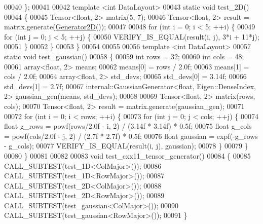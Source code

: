 \begin{DoxyCode}
00040 \};
00041 
00042 \textcolor{keyword}{template} <\textcolor{keywordtype}{int} DataLayout>
00043 \textcolor{keyword}{static} \textcolor{keywordtype}{void} test\_2D()
00044 \{
00045   Tensor<float, 2> matrix(5, 7);
00046   Tensor<float, 2> result = matrix.generate(\hyperlink{struct_generator2_d}{Generator2D}());
00047 
00048   \textcolor{keywordflow}{for} (\textcolor{keywordtype}{int} i = 0; i < 5; ++i) \{
00049     \textcolor{keywordflow}{for} (\textcolor{keywordtype}{int} j = 0; j < 5; ++j) \{
00050       VERIFY\_IS\_EQUAL(result(i, j), 3*i + 11*j);
00051     \}
00052   \}
00053 \}
00054 
00055 
00056 \textcolor{keyword}{template} <\textcolor{keywordtype}{int} DataLayout>
00057 \textcolor{keyword}{static} \textcolor{keywordtype}{void} test\_gaussian()
00058 \{
00059   \textcolor{keywordtype}{int} rows = 32;
00060   \textcolor{keywordtype}{int} cols = 48;
00061   array<float, 2> means;
00062   means[0] = rows / 2.0f;
00063   means[1] = cols / 2.0f;
00064   array<float, 2> std\_devs;
00065   std\_devs[0] = 3.14f;
00066   std\_devs[1] = 2.7f;
00067   internal::GaussianGenerator<float, Eigen::DenseIndex, 2> gaussian\_gen(means, std\_devs);
00068 
00069   Tensor<float, 2> matrix(rows, cols);
00070   Tensor<float, 2> result = matrix.generate(gaussian\_gen);
00071 
00072   \textcolor{keywordflow}{for} (\textcolor{keywordtype}{int} i = 0; i < rows; ++i) \{
00073     \textcolor{keywordflow}{for} (\textcolor{keywordtype}{int} j = 0; j < cols; ++j) \{
00074       \textcolor{keywordtype}{float} g\_rows = powf(rows/2.0f - i, 2) / (3.14f * 3.14f) * 0.5f;
00075       \textcolor{keywordtype}{float} g\_cols = powf(cols/2.0f - j, 2) / (2.7f * 2.7f) * 0.5f;
00076       \textcolor{keywordtype}{float} gaussian = expf(-g\_rows - g\_cols);
00077       VERIFY\_IS\_EQUAL(result(i, j), gaussian);
00078     \}
00079   \}
00080 \}
00081 
00082 
00083 \textcolor{keywordtype}{void} test\_cxx11\_tensor\_generator()
00084 \{
00085   CALL\_SUBTEST(test\_1D<ColMajor>());
00086   CALL\_SUBTEST(test\_1D<RowMajor>());
00087   CALL\_SUBTEST(test\_2D<ColMajor>());
00088   CALL\_SUBTEST(test\_2D<RowMajor>());
00089   CALL\_SUBTEST(test\_gaussian<ColMajor>());
00090   CALL\_SUBTEST(test\_gaussian<RowMajor>());
00091 \}
\end{DoxyCode}
